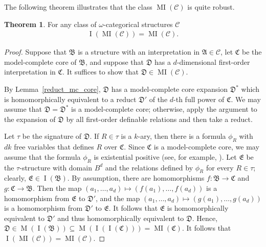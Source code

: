 \documentclass{amsart}
\theoremstyle{definition}
\newtheorem{theorem}{Theorem}[section]
\theoremstyle{remark}
\numberwithin{equation}{section}
\DeclareMathOperator{\I}{\operatorname{I}}
\DeclareMathOperator{\MI}{\operatorname{MI}}
\DeclareMathOperator{\M}{\operatorname{M}}
\newcommand{\fa}{\mathfrak{A}}
\newcommand{\fb}{\mathfrak{B}}
\newcommand{\fc}{\mathfrak{C}}
\newcommand{\fd}{\mathfrak{D}}
\newcommand{\fe}{\mathfrak{E}}
\begin{document}
The following theorem illustrates that 
the class $\MI({\mathcal C})$ is quite robust. 
\begin{theorem}\label{prop:IMI-MI}
    For any class of $\omega$-categorical structures ${\mathcal C}$ 
    \begin{align*} \I(\MI({\mathcal C})) = \MI({\mathcal C}). 
    \end{align*}
\end{theorem}
\begin{proof}
    Suppose that $\fb$ is a structure with an interpretation in $\fa \in {\mathcal C}$, let $\fc$ be the model-complete core of
    $\fb$, and suppose that $\fd$ has a $d$-dimensional first-order interpretation in $\fc$. It suffices to show that $\fd \in \MI({\mathcal C})$. 

    By Lemma~\ref{reduct_mc_core}, $\fd$ has a model-complete core expansion $\fd^*$ which is homomorphically equivalent to a reduct $\fd'$ of the $d$-th full power of $\fc$. We may assume that $\fd = \fd^*$ is a model-complete core; otherwise, apply the argument to the expansion of $\fd$ by all first-order definable relations and then take a reduct.
    
    
    Let $\tau$ be the signature of $\fd$. 
    If $R \in \tau$ is a $k$-ary, then there is a formula $\phi_R$ with $dk$ free variables that defines $R$ over $\fc$. Since $\fc$ is a model-complete core, 
    we may assume that the formula $\phi_R$ is existential positive (see, for example,  \cite[Proposition 2.6.13]{bodirsky2021complexity}). 
    Let $\fe$ be the $\tau$-structure with domain $B^d$ and the relations defined by $\phi_R$ for every $R \in \tau$; clearly, 
    $\fe \in \I(\fb)$. 
    By assumption, there are homomorphisms $f \colon \fb \to \fc$ and
    $g \colon \fc \to \fb$. 
    Then the map $(a_1,\dots,a_d) \mapsto (f(a_1),\dots,f(a_d))$ is a homomorphism from $\fe$ to $\fd'$, and the map 
    $(a_1,\dots,a_d) \mapsto (g(a_1),\dots,g(a_d))$ is a homomorphism from $\fd'$ to $\fe$. It follows that $\fe$ is homomorphically equivalent to $\fd'$ and thus homomorphically equivalent to $\fd$. Hence, $\fd \in \M(\I(\fb)) \subseteq \M(\I(\I(\fc))) = \MI(\fc)$. It follows that
    $\I(\MI({\mathcal C})) = \MI({\mathcal C})$. 
\end{proof}
\end{document}
